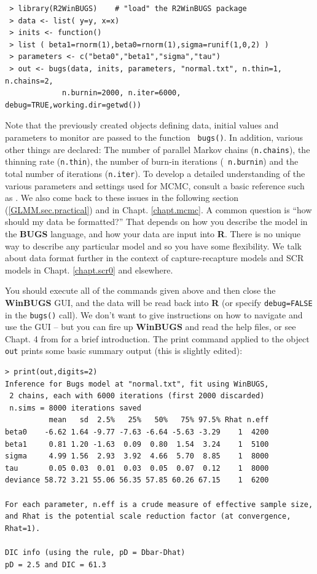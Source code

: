  
{\small
\begin{verbatim}
 > library(R2WinBUGS)    # "load" the R2WinBUGS package
 > data <- list( y=y, x=x)
 > inits <- function()
 > list ( beta1=rnorm(1),beta0=rnorm(1),sigma=runif(1,0,2) )
 > parameters <- c("beta0","beta1","sigma","tau")
 > out <- bugs(data, inits, parameters, "normal.txt", n.thin=1, n.chains=2,
             n.burnin=2000, n.iter=6000, debug=TRUE,working.dir=getwd())
\end{verbatim}
}

Note that the previously created objects defining data, initial values
and parameters to monitor are passed to the function \mbox{\tt
  bugs()}.  In addition, various other things are declared: The number
of parallel Markov chains (\mbox{\tt n.chains}), the thinning rate
(\mbox{\tt n.thin}), the number of burn-in iterations (\mbox{\tt
  n.burnin}) and the total number of iterations (\mbox{\tt n.iter}).
To develop a detailed understanding of the various parameters and
settings used for MCMC, consult a basic reference such as
\citet{kery:2010}. We also come back to these issues in the following
section (\ref{GLMM.sec.practical}) and in Chapt. \ref{chapt.mcmc}.
A common question is ``how should my data be formatted?'' That depends
on how you describe the model in the {\bf BUGS} language, and how your
data are input into {\bf R}. There is no unique way to describe any
particular model and so you have some flexibility. We talk about data
format further in the context of capture-recapture models and SCR
models in Chapt. \ref{chapt.scr0} and elsewhere. 


You should execute all of the commands given above and then
close the {\bf WinBUGS} GUI, and the data will be
read back into {\bf R} (or specify \mbox{\tt debug=FALSE} in the 
\mbox{\tt bugs()} call).  We don't
want to give instructions on how to navigate and use the GUI -- but you
can fire up {\bf WinBUGS} and read the help files, or see Chapt. 4 from
\citet{kery:2010} for a brief introduction.
The print command applied to the object \mbox{\tt out} prints some
basic summary output (this is slightly edited):

{\small
\begin{verbatim}
> print(out,digits=2)
Inference for Bugs model at "normal.txt", fit using WinBUGS,
 2 chains, each with 6000 iterations (first 2000 discarded)
 n.sims = 8000 iterations saved
          mean   sd  2.5%   25%   50%   75% 97.5% Rhat n.eff
beta0    -6.62 1.64 -9.77 -7.63 -6.64 -5.63 -3.29    1  4200
beta1     0.81 1.20 -1.63  0.09  0.80  1.54  3.24    1  5100
sigma     4.99 1.56  2.93  3.92  4.66  5.70  8.85    1  8000
tau       0.05 0.03  0.01  0.03  0.05  0.07  0.12    1  8000
deviance 58.72 3.21 55.06 56.35 57.85 60.26 67.15    1  6200

For each parameter, n.eff is a crude measure of effective sample size,
and Rhat is the potential scale reduction factor (at convergence, Rhat=1).

DIC info (using the rule, pD = Dbar-Dhat)
pD = 2.5 and DIC = 61.3
\end{verbatim}
}


